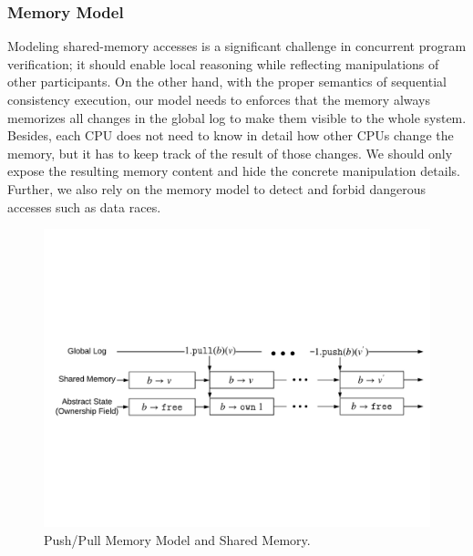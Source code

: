 \subsubsection{Memory Model}

Modeling shared-memory accesses is 
a significant challenge in concurrent program verification;
it should enable local reasoning while reflecting manipulations of other participants.
On the other hand, 
with the proper semantics of sequential consistency execution,
our model needs to enforces that the memory always memorizes all changes in the global log to make them visible to the whole system.
Besides,   
each CPU does not need to know in detail how other CPUs 
change the memory, but it has to keep track of the result of those changes.
We should  only expose the resulting memory 
content and hide the concrete manipulation details.
Further, we also rely on the memory model
to detect and forbid dangerous accesses such as data races.


\begin{figure}
\includegraphics[width=\textwidth]{figs/ccal/pushpullsharedmemory}
\caption{Push/Pull Memory Model and Shared Memory.}
\label{fig:chapter:ccal:push-pull-memory-model-and-shared-memory}
\end{figure}

